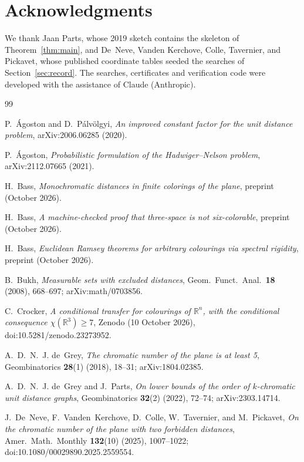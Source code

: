 \documentclass[11pt]{article}
\theoremstyle{definition}
\theoremstyle{remark}
\newcommand{\R}{\mathbb{R}}
\begin{document}
\section*{Acknowledgments}
We thank Jaan Parts, whose 2019 sketch \cite{Parts19} contains the
skeleton of Theorem~\ref{thm:main}, and De~Neve, Vanden Kerchove, Colle,
Tavernier, and Pickavet, whose published coordinate tables
\cite{DeNeve25} seeded the searches of Section~\ref{sec:record}.
The searches, certificates and verification code were developed with the
assistance of Claude (Anthropic).

\begin{thebibliography}{99}

P.~\'Agoston and D.~P\'alv\"olgyi,
\emph{An improved constant factor for the unit distance problem},
arXiv:2006.06285 (2020).

P.~\'Agoston,
\emph{Probabilistic formulation of the Hadwiger--Nelson problem},
arXiv:2112.07665 (2021).

H.~Bass,
\emph{Monochromatic distances in finite colorings of the plane},
preprint (October 2026).

H.~Bass,
\emph{A machine-checked proof that three-space is not six-colorable},
preprint (October 2026).

H.~Bass,
\emph{Euclidean Ramsey theorems for arbitrary colourings via spectral
rigidity}, preprint (October 2026).

B.~Bukh,
\emph{Measurable sets with excluded distances},
Geom.\ Funct.\ Anal.\ \textbf{18} (2008), 668--697; arXiv:math/0703856.

C.~Crocker,
\emph{A conditional transfer for colourings of $\R^n$, with the
conditional consequence $\chi(\R^3)\ge7$}, Zenodo (10 October 2026),
doi:10.5281/zenodo.23273952.

A.~D.~N.~J. de~Grey,
\emph{The chromatic number of the plane is at least 5},
Geombinatorics \textbf{28}(1) (2018), 18--31; arXiv:1804.02385.

A.~D.~N.~J. de~Grey and J.~Parts,
\emph{On lower bounds of the order of $k$-chromatic unit distance
graphs}, Geombinatorics \textbf{32}(2) (2022), 72--74; arXiv:2303.14714.

J.~De~Neve, F.~Vanden~Kerchove, D.~Colle, W.~Tavernier, and
M.~Pickavet,
\emph{On the chromatic number of the plane with two forbidden
distances}, Amer.\ Math.\ Monthly \textbf{132}(10) (2025), 1007--1022;
doi:10.1080/00029890.2025.2559554.


\end{thebibliography}
\end{document}

